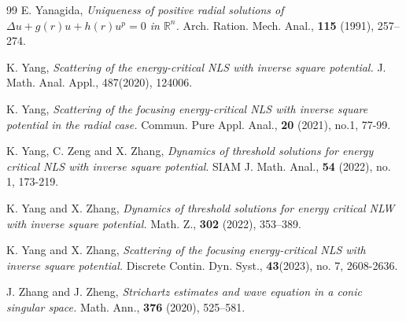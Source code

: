 \documentclass[12pt]{amsart}
\begin{document}
\begin{thebibliography}{99}
%
 E. Yanagida, \emph{Uniqueness of positive radial solutions of $\Delta u + g(r)u + h(r)u^p = 0$ in $\mathbb{R}^n$.} Arch. Ration. Mech. Anal., \textbf{115} (1991), 257--274.

 K. Yang,  \emph{Scattering of the energy-critical NLS with inverse square potential.} J. Math. Anal. Appl., 487(2020), 124006.

 K. Yang,  \emph{Scattering of the focusing energy-critical NLS with inverse square potential in the radial case.}   Commun. Pure Appl. Anal., {\bf 20} (2021), no.1, 77-99.

 K. Yang, C. Zeng and X. Zhang, \emph{Dynamics of threshold solutions for energy critical NLS with inverse square potential}. SIAM J. Math. Anal., \textbf{54} (2022), no. 1, 173-219.

 K. Yang and X. Zhang, \emph{Dynamics of threshold solutions for energy critical NLW with inverse square potential.} Math. Z., \textbf{302} (2022), 353--389.

 K. Yang and X. Zhang, \emph{Scattering of
the focusing energy-critical NLS with inverse square potential.} Discrete Contin. Dyn. Syst., \textbf{43}(2023), no. 7, 2608-2636.

 J. Zhang and J. Zheng, \emph{Strichartz estimates and wave equation in a conic singular space.} Math. Ann., \textbf{376} (2020), 525--581.



 







 
\end{thebibliography}
\end{document}
